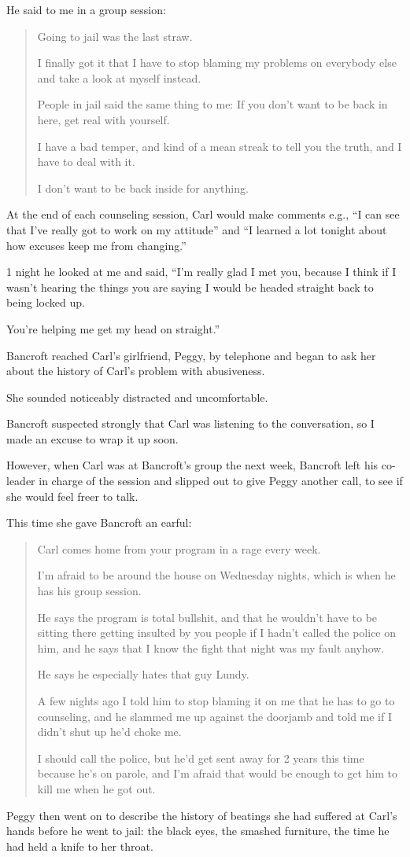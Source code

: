 \documentclass[oneside]{article}
\numberwithin{equation}{section}
\begin{document}
He said to me in a group session:
\begin{quotation}
    Going to jail was the last straw.
    
    I finally got it that I have to stop blaming my problems on everybody else and take a look at myself instead.
    
    People in jail said the same thing to me: If you don't want to be back in here, get real with yourself.
    
    I have a bad temper, and kind of a mean streak to tell you the truth, and I have to deal with it.
    
    I don't want to be back inside for anything.
\end{quotation}
At the end of each counseling session, Carl would make comments e.g., ``I can see that I've really got to work on my attitude'' and ``I learned a lot tonight about how excuses keep me from changing.''

1 night he looked at me and said, ``I'm really glad I met you, because I think if I wasn't hearing the things you are saying I would be headed straight back to being locked up.

You're helping me get my head on straight.''

%
Bancroft reached Carl's girlfriend, Peggy, by telephone and began to ask her about the history of Carl's problem with abusiveness.

She sounded noticeably distracted and uncomfortable.

Bancroft suspected strongly that Carl was listening to the conversation, so I made an excuse to wrap it up soon.

However, when Carl was at Bancroft's group the next week, Bancroft left his co-leader in charge of the session and slipped out to give Peggy another call, to see if she would feel freer to talk.

This time she gave Bancroft an earful:
\begin{quotation}
    Carl comes home from your program in a rage every week.
    
    I'm afraid to be around the house on Wednesday nights, which is when he has his group session.
    
    He says the program is total bullshit, and that he wouldn't have to be sitting there getting insulted by you people if I hadn't called the police on him, and he says that I know the fight that night was my fault anyhow.
    
    He says he especially hates that guy Lundy.
    
    A few nights ago I told him to stop blaming it on me that he has to go to counseling, and he slammed me up against the doorjamb and told me if I didn't shut up he'd choke me.
    
    I should call the police, but he'd get sent away for 2 years this time because he's on parole, and I'm afraid that would be enough to get him to kill me when he got out.
\end{quotation}
Peggy then went on to describe the history of beatings she had suffered at Carl's hands before he went to jail: the black eyes, the smashed furniture, the time he had held a knife to her throat.
\end{document}
